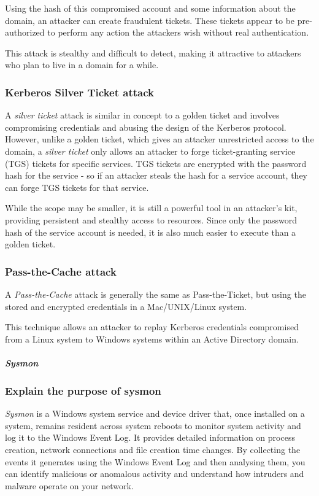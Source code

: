 Using the hash of this compromised account and some information about the domain, an attacker can create fraudulent tickets. These tickets appear to be pre-authorized to perform any action the attackers wish without real authentication.

This attack is stealthy and difficult to detect, making it attractive to attackers who plan to live in a domain for a while.

\subsubsection{Kerberos Silver Ticket attack}
A \textit{silver ticket} attack is similar in concept to a golden ticket and involves compromising credentials and abusing the design of the Kerberos protocol. However, unlike a golden ticket, which gives an attacker unrestricted access to the domain, a \textit{silver ticket} only allows an attacker to forge ticket-granting service (TGS) tickets for specific services. TGS tickets are encrypted with the password hash for the service - so if an attacker steals the hash for a service account, they can forge TGS tickets for that service.

While the scope may be smaller, it is still a powerful tool in an attacker's kit, providing persistent and stealthy access to resources. Since only the password hash of the service account is needed, it is also much easier to execute than a golden ticket.

\subsubsection{Pass-the-Cache attack}
A \textit{Pass-the-Cache} attack is generally the same as Pass-the-Ticket, but using the stored and encrypted credentials in a Mac/UNIX/Linux system.

This technique allows an attacker to replay Kerberos credentials compromised from a Linux system to Windows systems within an Active Directory domain.

\subparagraph{Sysmon}

\subsubsection{Explain the purpose of sysmon}
\textit{Sysmon} is a Windows system service and device driver that, once installed on a system, remains resident across system reboots to monitor system activity and log it to the Windows Event Log. It provides detailed information on process creation, network connections and file creation time changes. By collecting the events it generates using the Windows Event Log and then analysing them, you can identify malicious or anomalous activity and understand how intruders and malware operate on your network.


